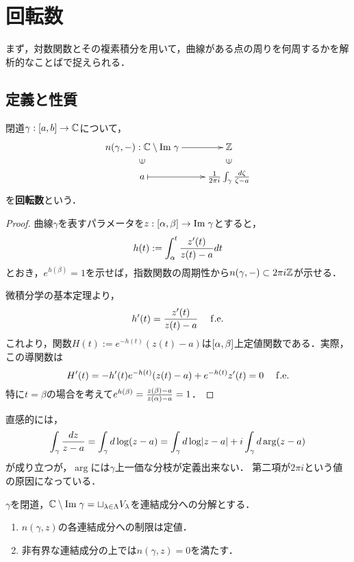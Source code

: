 \documentclass[uplatex, dvipdfmx]{jsreport}
\begin{document}
\section{回転数}

\begin{tcolorbox}[colframe=ForestGreen, colback=ForestGreen!10!white,breakable,colbacktitle=ForestGreen!40!white,coltitle=black,fonttitle=\bfseries\sffamily,
title=]
    まず，対数関数とその複素積分を用いて，曲線がある点の周りを何周するかを解析的なことばで捉えられる．
\end{tcolorbox}

\subsection{定義と性質}

\begin{definition}
    閉道$\gamma:[a,b]\to\mathbb{C}$について，
    \[\xymatrix@R-2pc{
        n(\gamma,-):\C\setminus\Im\gamma\ar[r]&\Z\\
        \rotatebox[origin=c]{90}{$\in$}&\rotatebox[origin=c]{90}{$\in$}\\
        a\ar@{|->}[r]&\frac{1}{2\pi i}\int_\gamma\frac{d\zeta}{\zeta-a}
    }\]
    を\textbf{回転数}という．
\end{definition}
\begin{proof}
    曲線$\gamma$を表すパラメータを$z:[\alpha,\beta]\to\mathrm{Im}\;\gamma$とすると，
    \[h(t):=\int^t_\alpha\frac{z'(t)}{z(t)-a}dt\]
    とおき，$e^{h(\beta)}=1$を示せば，指数関数の周期性から$n(\gamma,-)\subset 2\pi i\mathbb{Z}$が示せる．

    微積分学の基本定理より，
    \[h'(t)=\frac{z'(t)}{z(t)-a}\quad\;\mathrm{f.e.}\]
    これより，関数$H(t):=e^{-h(t)}(z(t)-a)$は$[\alpha,\beta]$上定値関数である．実際，この導関数は
    \[H'(t)=-h'(t)e^{-h(t)}(z(t)-a)+e^{-h(t)}z'(t)=0\quad\;\mathrm{f.e.}\]
    特に$t=\beta$の場合を考えて$e^{h(\beta)}=\frac{z(\beta)-a}{z(\alpha)-a}=1$．
\end{proof}
\begin{remarks}[対数関数のRiemann面を登っていく描像]
    直感的には，
    \[\int_\gamma\frac{dz}{z-a}=\int_\gamma d\log(z-a)=\int_\gamma d\log\lvert z-a\rvert+i\int_\gamma d\arg(z-a)\]
    が成り立つが，$\arg$には$\gamma$上一価な分枝が定義出来ない．
    第二項が$2\pi i$という値の原因になっている．
\end{remarks}

\begin{proposition}[回転数の性質]
    $\gamma$を閉道，$\mathbb{C}\setminus\mathrm{Im}\;\gamma=\sqcup_{\lambda\in\Lambda}V_\lambda$を連結成分への分解とする．
    \begin{enumerate}
        \item $n(\gamma,z)$の各連結成分への制限は定値．
        \item 非有界な連結成分の上では$n(\gamma,z)=0$を満たす．
    \end{enumerate}
\end{proposition}
\end{document}
